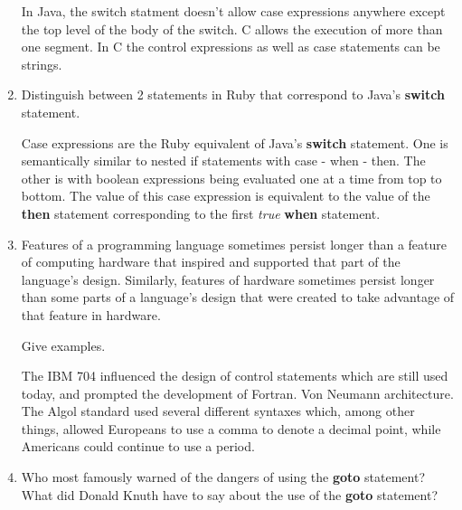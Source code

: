 \begin{enumerate}
\begin{answer}
    In Java, the switch statment doesn't allow case expressions anywhere except
the top level of the body of the switch.  C allows the execution of more than one
segment.  In C the control expressions as well as case statements can be strings.

    \end{answer}

  \item Distinguish between 2 statements in Ruby
    that correspond to Java's \textbf{switch} statement.
    
    \begin{answer}

    Case expressions are the Ruby equivalent of Java's \textbf{switch} statement. One is semantically similar to nested if statements with case - when - then. The other is with boolean expressions being evaluated one at a time from top to bottom. The value of this case expression is equivalent to the value of the \textbf{then} statement corresponding to the first \textit{true} \textbf{when} statement.

    \end{answer}
    

  \item Features of a programming language sometimes persist
    longer than a feature of computing hardware that inspired
    and supported that part of the language's design.
    Similarly, features of hardware sometimes persist longer
    than some parts of a language's design that were created
    to take advantage of that feature in hardware.

    Give examples.

 \begin{answer}

The IBM 704 influenced the design of control statements which are still used today, and prompted the development of Fortran.  Von Neumann architecture.  The Algol standard used several different syntaxes which, among other things, allowed Europeans to use a comma to denote a decimal point, while Americans could continue to use a period.

    \end{answer}

  \item Who most famously warned of the dangers of using the
    \textbf{goto} statement? What did Donald Knuth have to
    say about the use of the \textbf{goto} statement?

 \begin{answer}


\end{answer}
\end{enumerate}
